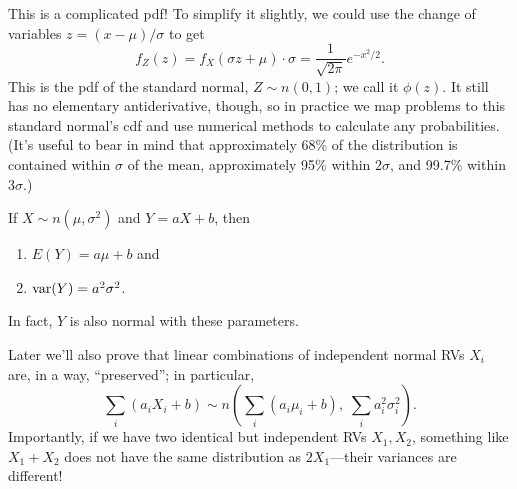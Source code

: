 \documentclass[../m157main.tex]{subfiles}
\begin{document}
This is a complicated pdf!
To simplify it slightly, we could use the change of variables $z = (x - \mu) / \sigma$ to get
\[ f_Z(z) = f_X(\sigma z + \mu) \cdot \sigma = \frac{1}{\sqrt{2\pi}} e^{-x^2 / 2}. \]
This is the pdf of the standard normal, $Z \sim n(0,1)$; we call it $\phi(z)$.
It still has no elementary antiderivative, though, so in practice we map problems to this standard normal's cdf and use numerical methods to calculate any probabilities.
(It's useful to bear in mind that approximately 68\% of the distribution is contained within $\sigma$ of the mean, approximately 95\% within $2\sigma$, and 99.7\% within $3\sigma$.)   %

\begin{theorem}
    If $X \sim n(\mu, \sigma^2)$ and $Y = aX + b$, then
    \begin{enumerate}[label=(\alph*)]
        \item $E(Y) = a\mu + b$ and
        \item $\textrm{var}(Y) = a^2 \sigma^2$.
    \end{enumerate}
    In fact, $Y$ is also normal with these parameters.
\end{theorem}

Later we'll also prove that linear combinations of independent normal RVs $X_i$ are, in a way, ``preserved''; in particular,
\[ \sum_{i}^{} (a_i X_i + b) \sim n \left( \sum_{i}^{} (a_i \mu_i + b), \; \sum_{i}^{} a_i^2 \sigma_i^2 \right). \]
Importantly, if we have two identical but independent RVs $X_1, X_2$, something like $X_1 + X_2$ does not have the same distribution as $2X_1$---their variances are different!
\end{document}
